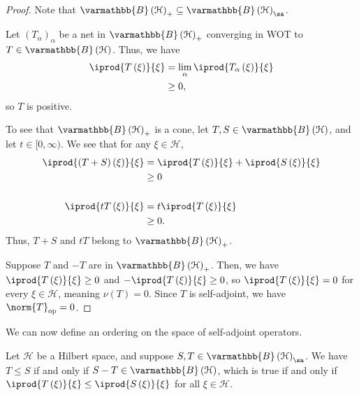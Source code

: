 \documentclass[10pt]{mypackage}
\renewcommand*{\mathbb}[1]{\varmathbb{#1}}
\newcommand{\B}{\mathbb{B}}
\begin{document}
\begin{proof}
  Note that $\B\left(\mathcal{H}\right)_{+}\subseteq \B\left(\mathcal{H}\right)_{\sa}$.\newline

  Let $\left(T_{\alpha}\right)_{\alpha}$ be a net in $\B\left(\mathcal{H}\right)_{+}$ converging in WOT to $T\in \B\left(\mathcal{H}\right)$. Thus, we have
  \begin{align*}
    \iprod{T\left(\xi\right)}{\xi} &= \lim_{\alpha} \iprod{T_{\alpha}\left(\xi\right)}{\xi}\\
                                   &\geq 0,
  \end{align*}
  so $T$ is positive.\newline

  To see that $\B\left(\mathcal{H}\right)_{+}$ is a cone, let $T,S\in \B\left(\mathcal{H}\right)$, and let $t\in [0,\infty)$. We see that for any $\xi\in \mathcal{H}$,
  \begin{align*}
    \iprod{\left(T+S\right)\left(\xi\right)}{\xi} &= \iprod{T\left(\xi\right)}{\xi} + \iprod{S\left(\xi\right)}{\xi}\\
                                                  &\geq 0\\
                                                  \\
    \iprod{tT\left(\xi\right)}{\xi} &= t \iprod{T\left(\xi\right)}{\xi}\\
                                    &\geq 0.
  \end{align*}
  Thus, $T+S$ and $tT$ belong to $\B\left(\mathcal{H}\right)_{+}$.\newline

  Suppose $T$ and $-T$ are in $\B\left(\mathcal{H}\right)_{+}$. Then, we have $ \iprod{T\left(\xi\right)}{\xi} \geq 0 $ and $ - \iprod{T\left(\xi\right)}{\xi} \geq 0 $, so $ \iprod{T\left(\xi\right)}{\xi} = 0 $ for every $\xi \in \mathcal{H}$, meaning $\nu\left(T\right) = 0$. Since $T$ is self-adjoint, we have $\norm{T}_{\text{op}} = 0$.
\end{proof}
We can now define an ordering on the space of self-adjoint operators.
\begin{definition}
  Let $\mathcal{H}$ be a Hilbert space, and suppose $S,T\in \B\left(\mathcal{H}\right)_{\sa}$. We have $T\leq S$ if and only if $S-T\in \B\left(\mathcal{H}\right)$, which is true if and only if $ \iprod{T\left(\xi\right)}{\xi} \leq \iprod{S\left(\xi\right)}{\xi} $ for all $\xi \in \mathcal{H}$.
\end{definition}
\end{document}
